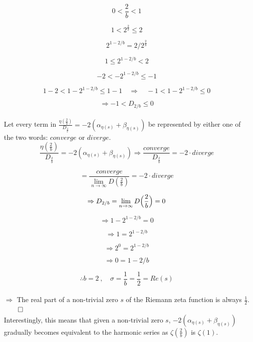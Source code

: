 \documentclass{amsart}
\begin{document}
	\[ 0 < \frac{2}{b} < 1 \]
	
	\[ 1 < 2^{\frac{2}{b}} \leq 2 \]
	
	\[ 2^{1-2/b} = 2 / 2^{\frac{2}{b}} \]
	
	\[ 1 \leq 2^{1-2/b} < 2 \]
	
	\[ -2 < -2^{1-2/b} \leq -1 \]
	
	\[ 1-2 < 1-2^{1-2/b} \leq 1-1 \quad \Rightarrow \quad -1 < 1-2^{1-2/b} \leq 0  \] 
	
	\[\Rightarrow -1 < D_{2/b} \leq 0  \] 
	\\
	
	Let every term in $\frac{\eta( \frac{2}{b} )}{D_{\frac{2}{b}}} = - 2(\alpha_{\eta(s)} + \beta_{\eta(s)})$ be represented by either one of the two words: $converge$ or $diverge$.
	\[\]
	\[ \frac{\eta( \frac{2}{b} )}{D_{\frac{2}{b}}} = - 2(\alpha_{\eta(s)} + \beta_{\eta(s)}) \Rightarrow \frac{converge}{D_{\frac{2}{b}}} = - 2 \cdot diverge \]
	
	\[ = \frac{converge}{\lim\limits_{n \to \infty}D(\frac{2}{b})} = - 2 \cdot diverge \]
	
	
	\[ \Rightarrow D_{2/b} = \lim\limits_{n \to \infty}D \Bigl( \frac{2}{b} \Bigr) = 0 \]
	
	\[ \Rightarrow 1-2^{1-2/b} = 0 \]
	
	\[ \Rightarrow 1 = 2^{1-2/b} \]
	
	\[ \Rightarrow 2^0 = 2^{1-2/b} \]
	
	\[ \Rightarrow 0 = 1-2/b \]
	
	\[ \therefore b=2 \ ,  \quad \sigma = \frac{1}{b} = \frac{1}{2} = Re(s) \]
	\\
	$\Rightarrow$ The real part of a non-trivial zero $s$ of the Riemann zeta function is always $\frac{1}{2}$. $\qed$
	\[\]
	Interestingly, this means that given a non-trivial zero $s$, $-2(\alpha_{\eta(s)} + \beta_{\eta(s)})$ gradually becomes equivalent to the harmonic series as $\zeta(\frac2b)$ is $\zeta(1)$.
	\\
	
	
	
	
	
\end{document}
